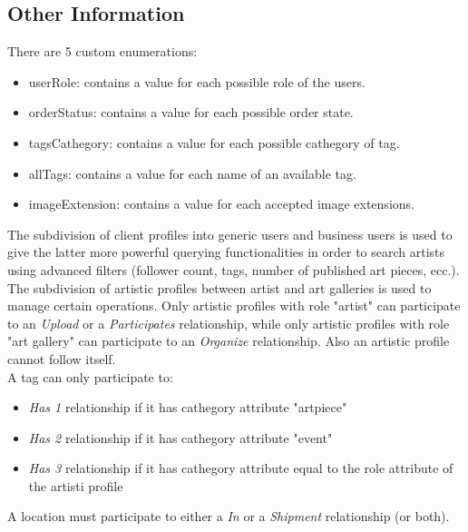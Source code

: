 \subsection{Other Information}


There are 5 custom enumerations:
\begin{itemize}
    \item userRole: contains a value for each possible role of the users.
    \item orderStatus: contains a value for each possible order state.
    \item tagsCathegory: contains a value for each possible cathegory of tag.
    \item allTags: contains a value for each name of an available tag.
    \item imageExtension: contains a value for each accepted image extensions.
\end{itemize}
The subdivision of client profiles into generic users and business users is used to give the latter more powerful querying
functionalities in order to search artists using advanced filters (follower count, tags, number of published art pieces, ecc.).\\
The subdivision of artistic profiles between artist and art galleries is used to manage certain operations. Only artistic 
profiles with role "artist" can participate to an \textit{Upload} or a \textit{Participates} relationship, while only artistic profiles with role
"art gallery" can participate to an \textit{Organize} relationship. Also an artistic profile cannot follow itself.\\
A tag can only participate to:
\begin{itemize}
    \item \textit{Has 1} relationship if it has cathegory attribute "artpiece"
    \item \textit{Has 2} relationship if it has cathegory attribute "event"
    \item \textit{Has 3} relationship if it has cathegory attribute equal to the role attribute of the artisti profile
\end{itemize}
A location must participate to either a \textit{In} or a \textit{Shipment} relationship (or both).\\